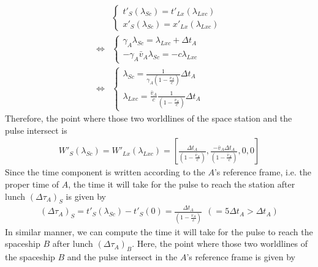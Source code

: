\documentclass[12pt]{article}
\begin{document}
\begin{align*}
&\left\{
\begin{array}{l}
t'_{S}(\lambda_{Sc}) = t'_{Lx}(\lambda_{Lxc})\\[1em]
x'_{S}(\lambda_{Sc}) = x'_{Lx}(\lambda_{Lxc}) 
\end{array}
\right.\\[1em]
\Leftrightarrow 
&\left\{
\begin{array}{l}
\gamma_A \lambda_{Sc} = \lambda_{Lxc} + \Delta t_A\\[1em]
- \gamma_A \bar{v}_A \lambda_{Sc} = -c \lambda_{Lxc}
\end{array}
\right.\\[1em]
\Leftrightarrow
&\left\{
\begin{array}{l}
\lambda_{Sc} = \frac{1}{\gamma_A \left(1 - \frac{\bar{v}_A}{c} \right)}\Delta t_A\\[1em]
\lambda_{Lxc} = \frac{\bar{v}_A}{c} \frac{1}{\left(1 - \frac{\bar{v}_A}{c} \right)} \Delta t_A
\end{array}
\right.
\end{align*}
Therefore, the point where those two worldlines of the space station and the pulse intersect is
\begin{gather*}
W'_S(\lambda_{Sc}) = W'_{Lx}(\lambda_{Lxc}) =  \left[\frac{\Delta t_A}{\left(1 - \frac{\bar{v}_A}{c} \right)},  \frac{-\bar{v}_A \Delta t_A}{\left(1 - \frac{\bar{v}_A}{c} \right)}, 0, 0 \right]
\end{gather*}
Since the time component is written according to the $A$'s reference frame, i.e. the proper time of $A$, the time it will take for the pulse to reach the station after lunch $(\Delta \tau_A)_S$ is given by
\begin{gather*}
(\Delta \tau_A)_S = t'_{S}(\lambda_{Sc}) - t'_{S}(0) = \frac{\Delta t_A}{\left(1 - \frac{\bar{v}_A}{c} \right)} ~~(= 5 \Delta t_A > \Delta t_A)
\end{gather*}
In similar manner, we can compute the time it will take for the pulse to reach the spaceship $B$ after lunch $(\Delta \tau_A)_B$.
Here, the point where those two worldlines of the spaceship $B$ and the pulse intersect in the $A$'s reference frame is given by
\end{document}
